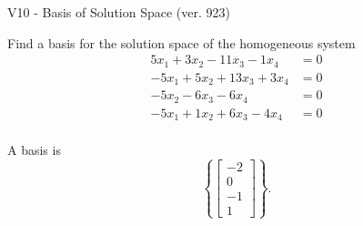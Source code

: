 \begin{exercise}
  \begin{exerciseTitle}V10 - Basis of Solution Space (ver. 923)\end{exerciseTitle}
  \begin{exerciseStatement}
    Find a basis for the solution space of the homogeneous system 
\begin{align*}
 5 x_ 1 + 3 x_ 2 -11 x_ 3 -1 x_ 4 &= 0  \\ 
  -5 x_ 1 + 5 x_ 2 + 13 x_ 3 + 3 x_ 4 &= 0  \\ 
  -5 x_ 2 -6 x_ 3 -6 x_ 4 &= 0  \\ 
  -5 x_ 1 + 1 x_ 2 + 6 x_ 3 -4 x_ 4 &= 0  \\ 
 \end{align*}


 
  \end{exerciseStatement}

  \begin{exerciseAnswer}
   A basis is   
\[\left\{\left[\begin{array}{c}
-2 \\
0 \\
-1 \\
1
\end{array}\right]\right\}.\]

  


  \end{exerciseAnswer}
\end{exercise}